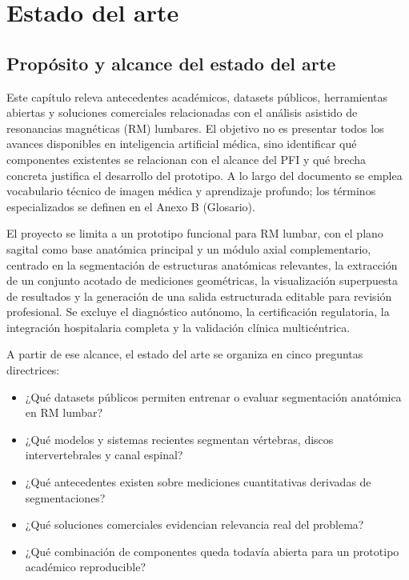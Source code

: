 \chapter{Estado del arte}

\section{Propósito y alcance del estado del arte}

Este capítulo releva antecedentes académicos, datasets públicos, herramientas abiertas y soluciones comerciales relacionadas con el análisis asistido de resonancias magnéticas (RM) lumbares. El objetivo no es presentar todos los avances disponibles en inteligencia artificial médica, sino identificar qué componentes existentes se relacionan con el alcance del PFI y qué brecha concreta justifica el desarrollo del prototipo. A lo largo del documento se emplea vocabulario técnico de imagen médica y aprendizaje profundo; los términos especializados se definen en el Anexo B (Glosario).

El proyecto se limita a un prototipo funcional para RM lumbar, con el plano sagital como base anatómica principal y un módulo axial complementario, centrado en la segmentación de estructuras anatómicas relevantes, la extracción de un conjunto acotado de mediciones geométricas, la visualización superpuesta de resultados y la generación de una salida estructurada editable para revisión profesional. Se excluye el diagnóstico autónomo, la certificación regulatoria, la integración hospitalaria completa y la validación clínica multicéntrica.

A partir de ese alcance, el estado del arte se organiza en cinco preguntas directrices:

\begin{itemize}
  \item ¿Qué datasets públicos permiten entrenar o evaluar segmentación anatómica en RM lumbar?
  \item ¿Qué modelos y sistemas recientes segmentan vértebras, discos intervertebrales y canal espinal?
  \item ¿Qué antecedentes existen sobre mediciones cuantitativas derivadas de segmentaciones?
  \item ¿Qué soluciones comerciales evidencian relevancia real del problema?
  \item ¿Qué combinación de componentes queda todavía abierta para un prototipo académico reproducible?
\end{itemize}

